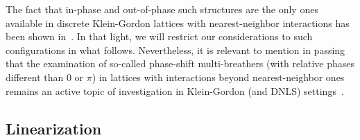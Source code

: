 \documentclass[12pt,reqno]{amsart}
\theoremstyle{definition}
\begin{document}
The fact that in-phase and out-of-phase such structures
are the only ones available in discrete Klein-Gordon 
lattices with nearest-neighbor interactions
has been shown in~\cite{KOUKOULOYANNIS20132022}.
In that light, we will restrict our considerations
to such configurations in what follows. Nevertheless,
it is relevant to mention in passing that the examination 
of so-called phase-shift multi-breathers (with relative
phases different than $0$ or $\pi$) in lattices with
interactions beyond nearest-neighbor ones remains an
active topic of investigation in Klein-Gordon (and DNLS)
settings~\cite{PENATI201992}.

\subsection{Linearization}\label{sec:DKGlinear}
\end{document}
